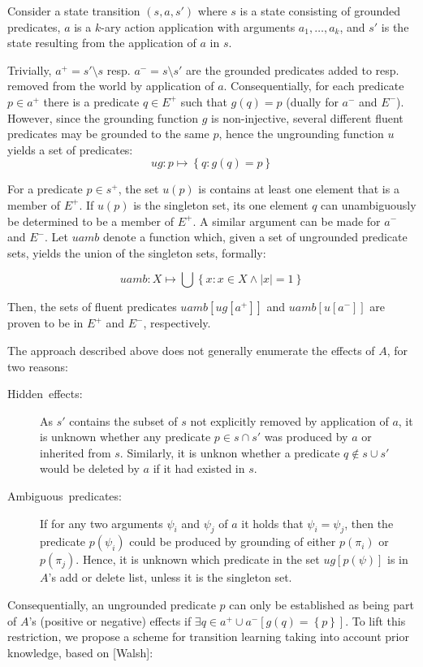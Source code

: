 \documentclass[../Master.tex]{subfiles}
\begin{document}
    Consider a state transition $\left(s,a,s'\right)$ where $s$ is a
state consisting of grounded predicates, $a$ is a $k$-ary action
application with arguments $a_{1},\dots,a_{k}$, and $s'$ is the
state resulting from the application of $a$ in $s$.

Trivially, $a^{+}=s'\setminus s$ resp. $a^{-}=s\setminus s'$ are
the grounded predicates added to resp. removed from the world by application
of $a$. Consequentially, for each predicate $p\in a^{+}$ there is
a predicate $q\in E^{+}$ such that $g\left(q\right)=p$ (dually for
$a^{-}$ and $E^{-}$). However, since the grounding function $g$
is non-injective, several different fluent predicates may be grounded
to the same $p$, hence the ungrounding function $u$ yields a set
of predicates:
\[
ug:p\mapsto\left\{ q:g\left(q\right)=p\right\}
\]


For a predicate $p\in s^{+}$, the set $u\left(p\right)$ is contains
at least one element that is a member of $E^{+}$. If $u\left(p\right)$
is the singleton set, its one element $q$ can unambiguously be determined
to be a member of $E^{+}$. A similar argument can be made for $a^{-}$
and $E^{-}$. Let $uamb$ denote a function which, given a set of
ungrounded predicate sets, yields the union of the singleton sets,
formally:

\[
uamb:X\mapsto\bigcup\left\{ x:x\in X\land\left|x\right|=1\right\}
\]


Then, the sets of fluent predicates $uamb\left[ug\left[a^{+}\right]\right]$
and $uamb\left[u\left[a^{-}\right]\right]$ are proven to be in $E^{+}$
and $E^{-}$, respectively.

The approach described above does not generally enumerate the effects
of $A$, for two reasons:
\begin{description}
\item [{Hidden\ effects:}] As $s'$ contains the subset of $s$ not explicitly
removed by application of $a$, it is unknown whether any predicate
$p\in s\cap s'$ was produced by $a$ or inherited from $s$. Similarly,
it is unknon whether a predicate $q\notin s\cup s'$ would be deleted
by $a$ if it had existed in $s$.
\item [{Ambiguous\ predicates:}] If for any two arguments $\psi_{i}$
and $\psi_{j}$ of $a$ it holds that $\psi_{i}=\psi_{j}$, then the
predicate $p\left(\psi_{i}\right)$ could be produced by grounding
of either $p\left(\pi_{i}\right)$ or $p\left(\pi_{j}\right)$. Hence,
it is unknown which predicate in the set $ug\left[p\left(\psi\right)\right]$
is in $A$'s add or delete list, unless it is the singleton set.
\end{description}
Consequentially, an ungrounded predicate $p$ can only be established
as being part of $A$'s (positive or negative) effects if $\exists q\in a^{+}\cup a^{-}\left[g\left(q\right)=\left\{ p\right\} \right]$.
To lift this restriction, we propose a scheme for transition learning
taking into account prior knowledge, based on {[}Walsh{]}:
\end{document}
